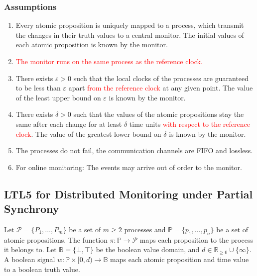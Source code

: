 \documentclass[envcountsame, runningheads]{llncs}
\title{}
\author{} %
\institute{} %
\date{}
\newcommand{\rednote}[2][]{{\todo[color=magenta!80,size=\footnotesize,#1]{\normalcolor\normalfont#2}}}
\newcommand\alert[1]{\textcolor{red}{#1}}
\newcommand{\R}{\mathbb{R}}
\newcommand{\B}{\mathbb{B}}
\newcommand{\?}{\text{?}}
\begin{document}
	\maketitle

	\subsubsection*{Assumptions}
	\begin{enumerate}
		\item Every atomic proposition is uniquely mapped to a process, which transmit the changes in their truth values to a central monitor. The initial values of each atomic proposition is known by the monitor.
		\item \alert{The monitor runs on the same process as the reference clock.}
		\item There exists $\varepsilon > 0$ such that the local clocks of the processes are guaranteed to be less than $\varepsilon$ apart \alert{from the reference clock} at any given point. The value of the least upper bound on $\varepsilon$ is known by the monitor. %
		\item There exists $\delta > 0$ such that the values of the atomic propositions stay the same after each change for at least $\delta$ time units \alert{with respect to the reference clock}. The value of the greatest lower bound on $\delta$ is known by the monitor.
		\item The processes do not fail, the communication channels are FIFO and lossless.
		\item For online monitoring: The events may arrive out of order to the monitor. \rednote{Not taken into account yet.}
	\end{enumerate}
	
	\subsection*{LTL5 for Distributed Monitoring under Partial Synchrony}
	Let $\mathcal{P} = \{P_1, \ldots, P_m\}$ be a set of $m \geq 2$ processes and $\mathbb{P} = \{p_1, \ldots, p_n\}$ be a set of atomic propositions.
	The function $\pi : \mathbb{P} \to \mathcal{P}$ maps each proposition to the process it belongs to.
	Let $\B = \{\bot, \top\}$ be the boolean value domain, and $d \in \R_{\geq 0} \cup \{\infty\}$.
	A boolean signal $w : \mathbb{P} \times [0,d) \to \B$ maps each atomic proposition and time value to a boolean truth value.
\end{document}
